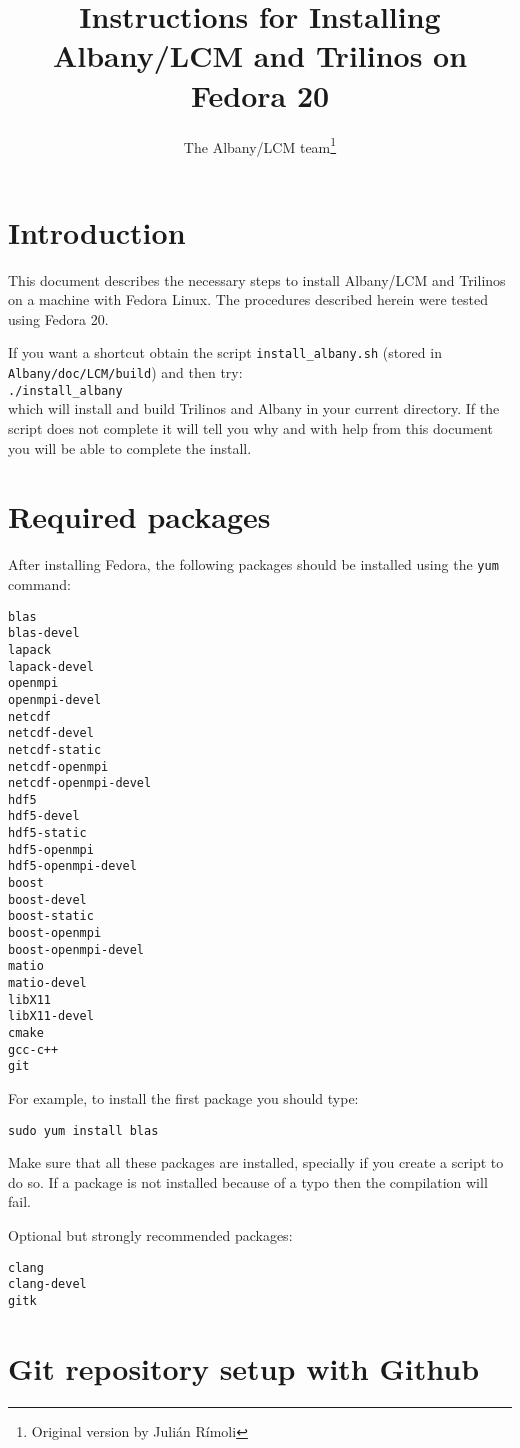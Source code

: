 \documentclass[10pt,a4paper]{article} \usepackage[utf8]{inputenc}
\author{The Albany/LCM team\thanks{Original version by Juli\'an R\'imoli}}
\title{Instructions for Installing Albany/LCM and Trilinos on Fedora 20}
\begin{document}
\maketitle

\section{Introduction}
This document describes the necessary steps to install Albany/LCM and
Trilinos on a machine with Fedora Linux. The procedures described
herein were tested using Fedora 20.

If you want a shortcut obtain the script \verb+install_albany.sh+ (stored in \verb+Albany/doc/LCM/build+) and then try: \\
\verb+./install_albany+ \\
which will install and build Trilinos and Albany in your current directory. 
If the script does not complete it will tell you why and with help from this document you will be able to complete the install.

\section{Required packages}
After installing Fedora, the following packages should be installed
using the {\tt yum} command:
\begin{verbatim}
blas
blas-devel
lapack
lapack-devel
openmpi
openmpi-devel
netcdf
netcdf-devel
netcdf-static
netcdf-openmpi
netcdf-openmpi-devel
hdf5
hdf5-devel
hdf5-static
hdf5-openmpi
hdf5-openmpi-devel
boost
boost-devel
boost-static
boost-openmpi
boost-openmpi-devel
matio
matio-devel
libX11
libX11-devel
cmake
gcc-c++
git
\end{verbatim}

For example, to install the first package you should type:
\begin{verbatim}
sudo yum install blas
\end{verbatim}

Make sure that all these packages are installed, specially if you
create a script to do so. If a package is not installed because of a
typo then the compilation will fail.

Optional but strongly recommended packages:
\begin{verbatim}
clang
clang-devel
gitk
\end{verbatim}

\section{Git repository setup with Github}
\end{document}
